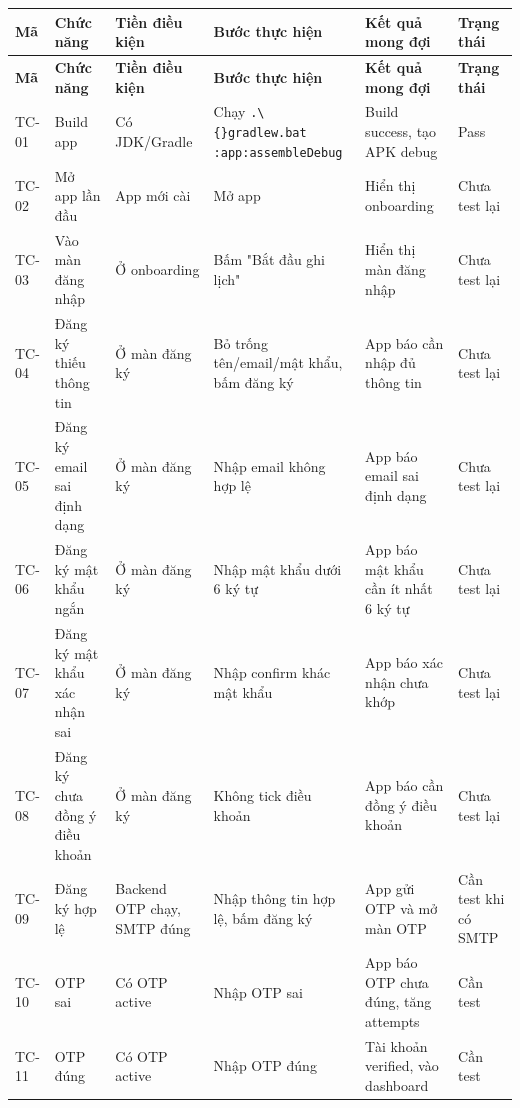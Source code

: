 \documentclass[12pt,a4paper]{report}
\begin{document}
\begin{longtable}{|>{\raggedright\arraybackslash}p{}|>{\raggedright\arraybackslash}p{}|>{\raggedright\arraybackslash}p{}|>{\raggedright\arraybackslash}p{}|>{\raggedright\arraybackslash}p{}|>{\raggedright\arraybackslash}p{}|}
\hline
\textbf{Mã} & \textbf{Chức năng} & \textbf{Tiền điều kiện} & \textbf{Bước thực hiện} & \textbf{Kết quả mong đợi} & \textbf{Trạng thái} \\ \hline
\endfirsthead
\hline
\textbf{Mã} & \textbf{Chức năng} & \textbf{Tiền điều kiện} & \textbf{Bước thực hiện} & \textbf{Kết quả mong đợi} & \textbf{Trạng thái} \\ \hline
\endhead
TC-01 & Build app & Có JDK/Gradle & Chạy \texttt{.\textbackslash\{\}gradlew.bat :app:assembleDebug} & Build success, tạo APK debug & Pass \\ \hline
TC-02 & Mở app lần đầu & App mới cài & Mở app & Hiển thị onboarding & Chưa test lại \\ \hline
TC-03 & Vào màn đăng nhập & Ở onboarding & Bấm "Bắt đầu ghi lịch" & Hiển thị màn đăng nhập & Chưa test lại \\ \hline
TC-04 & Đăng ký thiếu thông tin & Ở màn đăng ký & Bỏ trống tên/email/mật khẩu, bấm đăng ký & App báo cần nhập đủ thông tin & Chưa test lại \\ \hline
TC-05 & Đăng ký email sai định dạng & Ở màn đăng ký & Nhập email không hợp lệ & App báo email sai định dạng & Chưa test lại \\ \hline
TC-06 & Đăng ký mật khẩu ngắn & Ở màn đăng ký & Nhập mật khẩu dưới 6 ký tự & App báo mật khẩu cần ít nhất 6 ký tự & Chưa test lại \\ \hline
TC-07 & Đăng ký mật khẩu xác nhận sai & Ở màn đăng ký & Nhập confirm khác mật khẩu & App báo xác nhận chưa khớp & Chưa test lại \\ \hline
TC-08 & Đăng ký chưa đồng ý điều khoản & Ở màn đăng ký & Không tick điều khoản & App báo cần đồng ý điều khoản & Chưa test lại \\ \hline
TC-09 & Đăng ký hợp lệ & Backend OTP chạy, SMTP đúng & Nhập thông tin hợp lệ, bấm đăng ký & App gửi OTP và mở màn OTP & Cần test khi có SMTP \\ \hline
TC-10 & OTP sai & Có OTP active & Nhập OTP sai & App báo OTP chưa đúng, tăng attempts & Cần test \\ \hline
TC-11 & OTP đúng & Có OTP active & Nhập OTP đúng & Tài khoản verified, vào dashboard & Cần test \\ \hline

\end{longtable}
\end{document}
